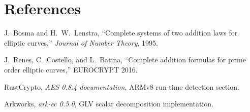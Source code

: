 \documentclass[10pt]{article}
\begin{document}
\section*{References}

J.~Bosma and H.~W.~Lenstra, ``Complete systems of two addition laws for elliptic curves,'' \emph{Journal of Number Theory}, 1995.

J.~Renes, C.~Costello, and L.~Batina, ``Complete addition formulas for prime order elliptic curves,'' EUROCRYPT 2016.

RustCrypto, \emph{AES 0.8.4 documentation}, ARMv8 run-time detection section.

Arkworks, \emph{ark-ec 0.5.0}, GLV scalar decomposition implementation.
\end{document}

